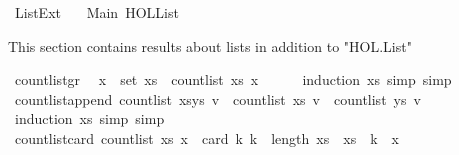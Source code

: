 %
\begin{isabellebody}%
%
%
\isadelimdocument
%
\endisadelimdocument
%
\isatagdocument
%
\isamarkuptrue%
%
\endisatagdocument
{\isafolddocument}%
%
\isadelimdocument
%
\endisadelimdocument
%
\isadelimtheory
%
\endisadelimtheory
%
\isatagtheory
{}\isamarkupfalse%
\ List{\isacharunderscore}{\kern0pt}Ext\isanewline
\ \ \ Main\ {\isachardoublequoteopen}HOL{\isachardot}{\kern0pt}List{\isachardoublequoteclose}\isanewline
{}%
\endisatagtheory
{\isafoldtheory}%
%
\isadelimtheory
%
\endisadelimtheory
%
\begin{isamarkuptext}%
This section contains results about lists in addition to "HOL.List"%
\end{isamarkuptext}\isamarkuptrue%
\isamarkupfalse%
\ count{\isacharunderscore}{\kern0pt}list{\isacharunderscore}{\kern0pt}gr{\isacharunderscore}{\kern0pt}{}{\isacharcolon}{\kern0pt}\isanewline
\ \ {\isachardoublequoteopen}{\isacharparenleft}{\kern0pt}x\ {\isasymin}\ set\ xs{\isacharparenright}{\kern0pt}\ {\isacharequal}{\kern0pt}\ {\isacharparenleft}{\kern0pt}count{\isacharunderscore}{\kern0pt}list\ xs\ x\ {\isasymge}\ {}{\isacharparenright}{\kern0pt}{\isachardoublequoteclose}\isanewline
%
\isadelimproof
\ \ %
\endisadelimproof
%
\isatagproof
{}\isamarkupfalse%
\ {\isacharparenleft}{\kern0pt}induction\ xs{\isacharcomma}{\kern0pt}\ simp{\isacharcomma}{\kern0pt}\ simp{\isacharparenright}{\kern0pt}%
\endisatagproof
{\isafoldproof}%
%
\isadelimproof
\isanewline
%
\endisadelimproof
\isanewline
{}\isamarkupfalse%
\ count{\isacharunderscore}{\kern0pt}list{\isacharunderscore}{\kern0pt}append{\isacharcolon}{\kern0pt}\ {\isachardoublequoteopen}count{\isacharunderscore}{\kern0pt}list\ {\isacharparenleft}{\kern0pt}xs{\isacharat}{\kern0pt}ys{\isacharparenright}{\kern0pt}\ v\ {\isacharequal}{\kern0pt}\ count{\isacharunderscore}{\kern0pt}list\ xs\ v\ {\isacharplus}{\kern0pt}\ count{\isacharunderscore}{\kern0pt}list\ ys\ v{\isachardoublequoteclose}\isanewline
%
\isadelimproof
\ \ %
\endisadelimproof
%
\isatagproof
{}\isamarkupfalse%
\ {\isacharparenleft}{\kern0pt}induction\ xs{\isacharcomma}{\kern0pt}\ simp{\isacharcomma}{\kern0pt}\ simp{\isacharparenright}{\kern0pt}%
\endisatagproof
{\isafoldproof}%
%
\isadelimproof
\isanewline
%
\endisadelimproof
\isanewline
{}\isamarkupfalse%
\ count{\isacharunderscore}{\kern0pt}list{\isacharunderscore}{\kern0pt}card{\isacharcolon}{\kern0pt}\ {\isachardoublequoteopen}count{\isacharunderscore}{\kern0pt}list\ xs\ x\ {\isacharequal}{\kern0pt}\ card\ {\isacharbraceleft}{\kern0pt}k{\isachardot}{\kern0pt}\ k\ {\isacharless}{\kern0pt}\ length\ xs\ {\isasymand}\ xs\ {\isacharbang}{\kern0pt}\ k\ {\isacharequal}{\kern0pt}\ x{\isacharbraceright}{\kern0pt}{\isachardoublequoteclose}\isanewline

\end{isabellebody}

